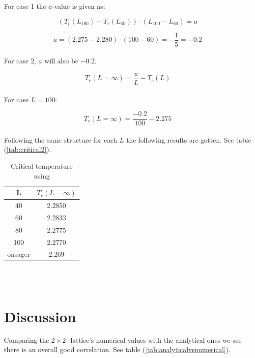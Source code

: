 \documentclass{article}
\begin{document}
  For case 1 the $a$-value is given as:

  $$(T_c(L_{100})-T_c(L_{60}))\cdot(L_{100}-L_{60})=a$$

  $$a=(2.275-2.280)\cdot(100-60)=-\frac{1}{5}=-0.2$$ \\

  For case 2, $a$ will also be $-0.2$.

  $$T_c(L=\infty)=\frac{a}{L}-T_c(L)$$ \\

  For case $L=100$:

  $$T_c(L=\infty)=\frac{-0.2}{100}-2.275$$ \\

  Following the same structure for each $L$ the following results are gotten. See table (\ref{tab:critical2}).

    \begin{table}[ht]
      \centering
      \caption{Critical temperature using \cite{onsager}}
      \vspace{2mm}
      \label{tab:critical}
      \begin{tabular}{|c|c|}
          \hline
           L & $T_c(L=\infty)$\\
          \hline \hline
          40  & 2.2850 \\
          60  & 2.2833 \\
          80  & 2.2775 \\
          100 & 2.2770 \\
          onsager & 2.269 \\
          \hline
      \end{tabular} \\
      \hspace{0pt}\\
    \end{table}


\vspace{1cm}

\clearpage
\newpage

\section{Discussion} \label{sec:Discussion}

Comparing the \texorpdfstring{ $2 \times 2$ }{text}-lattice's numerical values with the analytical ones we see there is an overall good correlation. See table (\ref{tab:analyticalvsnumerical}).\\
\end{document}
